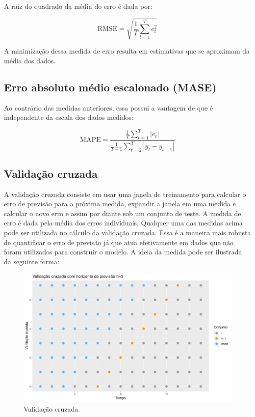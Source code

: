 \documentclass[
	12pt,				%
	openright,			%
	oneside,			%
	a4paper,			%
	english,			%
	french,				%
	spanish,			%
	brazil				%
	]{abntex2}
\begin{document}
A raíz do quadrado da média do erro é dada por:

$$\text{RMSE} = \sqrt{\frac{1}{T}\sum_{t=1}^{T}e_{t}^2}$$

A minimização dessa medida de erro resulta em estimativas que se aproximam da média dos dados.

\subsection{Erro absoluto médio escalonado (MASE)}

Ao contrário das medidas anteriores, essa possui a vantagem de que é independente da escala dos dados medidos:

$$\text{MAPE} = \frac{\frac{1}{T}\sum_{t=1}^T\left|e_t\right|}{\frac{1}{T-1}\sum_{t=2}^{T}\left|y_t-y_{t-1}\right|}$$

\subsection{Validação cruzada}\label{cruzada}

A validação cruzada consiste em usar uma janela de treinamento para calcular o erro de previsão para a próxima medida, expandir a janela em uma medida e calcular o novo erro e assim por diante sob um conjunto de teste. A medida de erro é dada pela média dos erros individuais. Qualquer uma das medidas acima pode ser utilizada no cálculo da validação cruzada. Essa é a maneira mais robusta de quantificar o erro de previsão já que atua efetivamente em dados que não foram utilizados para construir o modelo. A ideia da medida pode ser ilustrada da seguinte forma:

\begin{figure}[h]
    \centering
	\includegraphics[width=\textwidth]{crossh3}
	\caption{Validação cruzada.}
\end{figure}
\FloatBarrier
\end{document}
